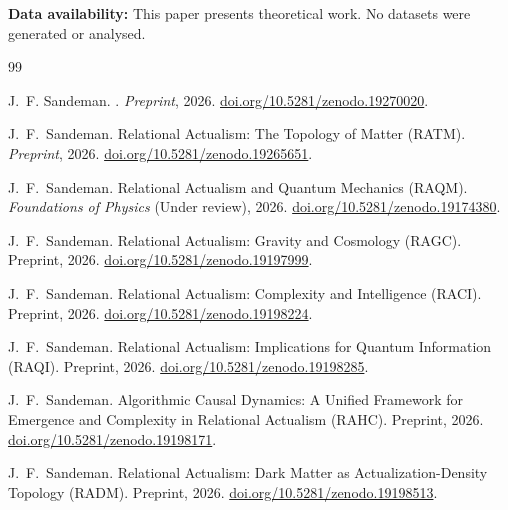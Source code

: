 \documentclass[11pt,a4paper]{article}
\theoremstyle{plain}
\theoremstyle{definition}
\theoremstyle{remark}
\begin{document}
\textbf{Data availability:} This paper presents theoretical work. No datasets
were generated or analysed.



\begin{thebibliography}{99}

J.~F. Sandeman.
.
\newblock \textit{Preprint}, 2026.
\newblock \href{https://doi.org/10.5281/zenodo.19270020}{doi.org/10.5281/zenodo.19270020}.


J.~F.~Sandeman.
\newblock Relational Actualism: The Topology of Matter ({RATM}).
\newblock \textit{Preprint}, 2026.
\newblock \href{https://doi.org/10.5281/zenodo.19265651}{doi.org/10.5281/zenodo.19265651}.

J.~F.~Sandeman.
\newblock Relational Actualism and Quantum Mechanics ({RAQM}).
\newblock \textit{Foundations of Physics} (Under review), 2026.
\newblock \href{https://doi.org/10.5281/zenodo.19174380}{doi.org/10.5281/zenodo.19174380}.

J.~F.~Sandeman.
\newblock Relational Actualism: Gravity and Cosmology ({RAGC}).
\newblock Preprint, 2026.
\newblock \href{https://doi.org/10.5281/zenodo.19197999}{doi.org/10.5281/zenodo.19197999}.

J.~F.~Sandeman.
\newblock Relational Actualism: Complexity and Intelligence ({RACI}).
\newblock Preprint, 2026.
\newblock \href{https://doi.org/10.5281/zenodo.19198224}{doi.org/10.5281/zenodo.19198224}.

J.~F.~Sandeman.
\newblock Relational Actualism: Implications for Quantum Information ({RAQI}).
\newblock Preprint, 2026.
\newblock \href{https://doi.org/10.5281/zenodo.19198285}{doi.org/10.5281/zenodo.19198285}.

J.~F.~Sandeman.
\newblock Algorithmic Causal Dynamics: A Unified Framework for Emergence
  and Complexity in Relational Actualism ({RAHC}).
\newblock Preprint, 2026.
\newblock \href{https://doi.org/10.5281/zenodo.19198171}{doi.org/10.5281/zenodo.19198171}.

J.~F.~Sandeman.
\newblock Relational Actualism: Dark Matter as Actualization-Density
  Topology ({RADM}).
\newblock Preprint, 2026.
\newblock \href{https://doi.org/10.5281/zenodo.19198513}{doi.org/10.5281/zenodo.19198513}.


\end{thebibliography}
\end{document}
